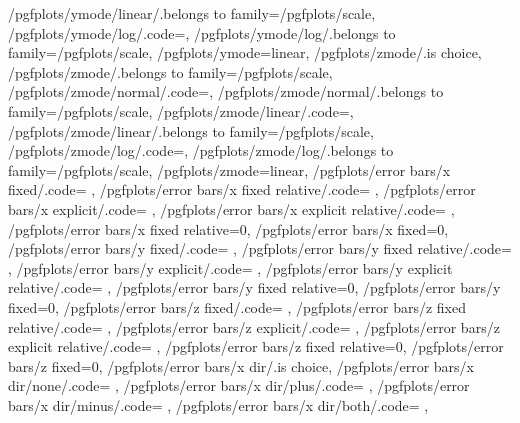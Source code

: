{	/pgfplots/ymode/linear/.belongs to family=/pgfplots/scale,
	/pgfplots/ymode/log/.code={\pgfplots@yislinearfalse},
	/pgfplots/ymode/log/.belongs to family=/pgfplots/scale,
	/pgfplots/ymode=linear,
	/pgfplots/zmode/.is choice,
	/pgfplots/zmode/.belongs to family=/pgfplots/scale,
	/pgfplots/zmode/normal/.code={\pgfplots@zislineartrue},
	/pgfplots/zmode/normal/.belongs to family=/pgfplots/scale,
	/pgfplots/zmode/linear/.code={\pgfplots@zislineartrue},
	/pgfplots/zmode/linear/.belongs to family=/pgfplots/scale,
	/pgfplots/zmode/log/.code={\pgfplots@zislinearfalse},
	/pgfplots/zmode/log/.belongs to family=/pgfplots/scale,
	/pgfplots/zmode=linear,
	/pgfplots/error bars/x fixed/.code=				\def\pgfplots@errorbars@xfixed{#1}\def\pgfplots@errorbars@xmode{0},
	/pgfplots/error bars/x fixed relative/.code=		\def\pgfplots@errorbars@xrel{#1}\def\pgfplots@errorbars@xmode{1},
	/pgfplots/error bars/x explicit/.code=			\def\pgfplots@errorbars@xmode{2},
	/pgfplots/error bars/x explicit relative/.code=	\def\pgfplots@errorbars@xmode{3},
	/pgfplots/error bars/x fixed relative=0,
	/pgfplots/error bars/x fixed=0,
	/pgfplots/error bars/y fixed/.code=				\def\pgfplots@errorbars@yfixed{#1}\def\pgfplots@errorbars@ymode{0},
	/pgfplots/error bars/y fixed relative/.code=		\def\pgfplots@errorbars@yrel{#1}\def\pgfplots@errorbars@ymode{1},
	/pgfplots/error bars/y explicit/.code=			\def\pgfplots@errorbars@ymode{2},
	/pgfplots/error bars/y explicit relative/.code=	\def\pgfplots@errorbars@ymode{3},
	/pgfplots/error bars/y fixed relative=0,
	/pgfplots/error bars/y fixed=0,
	/pgfplots/error bars/z fixed/.code=				\def\pgfplots@errorbars@zfixed{#1}\def\pgfplots@errorbars@zmode{0},
	/pgfplots/error bars/z fixed relative/.code=		\def\pgfplots@errorbars@zrel{#1}\def\pgfplots@errorbars@zmode{1},
	/pgfplots/error bars/z explicit/.code=			\def\pgfplots@errorbars@zmode{2},
	/pgfplots/error bars/z explicit relative/.code=	\def\pgfplots@errorbars@zmode{3},
	/pgfplots/error bars/z fixed relative=0,
	/pgfplots/error bars/z fixed=0,
	/pgfplots/error bars/x dir/.is choice,
	/pgfplots/error bars/x dir/none/.code={%
		\def\pgfplots@errorbars@xdirection{0}%
		\ifnum{}
			\ifnum{}
				\pgfplots@errorbars@enabledfalse
			\fi
		\fi
	},
	/pgfplots/error bars/x dir/plus/.code=				\def\pgfplots@errorbars@xdirection{1}\pgfplots@errorbars@enabledtrue,
	/pgfplots/error bars/x dir/minus/.code=				\def\pgfplots@errorbars@xdirection{2}\pgfplots@errorbars@enabledtrue,
	/pgfplots/error bars/x dir/both/.code=				\def\pgfplots@errorbars@xdirection{3}\pgfplots@errorbars@enabledtrue,
}
